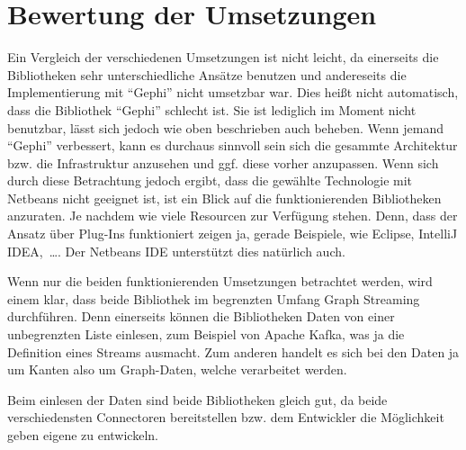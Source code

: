 \section{Bewertung der Umsetzungen}
Ein Vergleich der verschiedenen Umsetzungen ist nicht leicht, da einerseits die
Bibliotheken sehr unterschiedliche Ansätze benutzen und andereseits die
Implementierung mit \enquote{Gephi} nicht umsetzbar war. Dies heißt nicht
automatisch, dass die Bibliothek \enquote{Gephi} schlecht ist. Sie ist lediglich
im Moment nicht benutzbar, lässt sich jedoch wie oben beschrieben auch beheben.
Wenn jemand \enquote{Gephi} verbessert, kann es durchaus sinnvoll sein sich die
gesammte Architektur bzw. die Infrastruktur anzusehen und ggf. diese vorher
anzupassen. Wenn sich durch diese Betrachtung jedoch ergibt, dass die gewählte
Technologie mit Netbeans nicht geeignet ist, ist ein Blick auf die
funktionierenden Bibliotheken anzuraten. Je nachdem wie viele Resourcen zur
Verfügung stehen. Denn, dass der Ansatz über Plug-Ins funktioniert zeigen ja,
gerade Beispiele, wie Eclipse, IntelliJ IDEA,~\dots . Der Netbeans \gls{IDE}
unterstützt dies natürlich auch.

Wenn nur die beiden funktionierenden Umsetzungen betrachtet werden, wird einem
klar, dass beide Bibliothek im begrenzten Umfang Graph Streaming durchführen.
Denn einerseits können die Bibliotheken Daten von einer unbegrenzten Liste
einlesen, zum Beispiel von Apache Kafka, was ja die Definition eines Streams
ausmacht. Zum anderen handelt es sich bei den Daten ja um Kanten also um
Graph-Daten, welche verarbeitet werden.

Beim einlesen der Daten sind beide Bibliotheken gleich gut, da beide
verschiedensten Connectoren bereitstellen bzw. dem Entwickler die Möglichkeit
geben eigene zu entwickeln.
